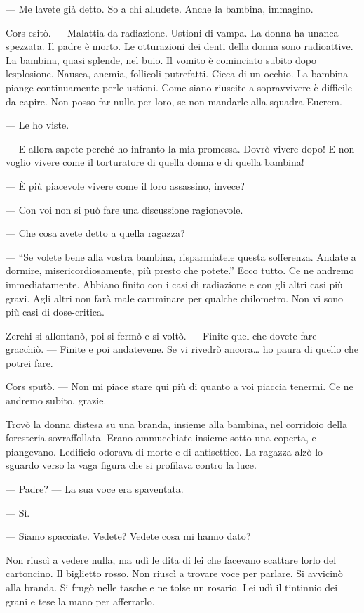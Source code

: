 --- Me l\textquotesingle avete già detto. So a chi alludete. Anche la
bambina, immagino.

Cors esitò. --- Malattia da radiazione. Ustioni di vampa. La donna ha
un\textquotesingle anca spezzata. Il padre è morto. Le otturazioni dei
denti della donna sono radioattive. La bambina, quasi splende, nel buio.
Il vomito è cominciato subito dopo l\textquotesingle esplosione. Nausea,
anemia, follicoli putrefatti. Cieca di un occhio. La bambina piange
continuamente perle ustioni. Come siano riuscite a sopravvivere è
difficile da capire. Non posso far nulla per loro, se non mandarle alla
squadra Eucrem.

--- Le ho viste.

--- E allora sapete perché ho infranto la mia promessa. Dovrò vivere
dopo! E non voglio vivere come il torturatore di quella donna e di
quella bambina!

--- È più piacevole vivere come il loro assassino, invece?

--- Con voi non si può fare una discussione ragionevole.

--- Che cosa avete detto a quella ragazza?

--- ``Se volete bene alla vostra bambina, risparmiatele questa
sofferenza. Andate a dormire, misericordiosamente, più presto che
potete.'' Ecco tutto. Ce ne andremo immediatamente. Abbiano finito con i
casi di radiazione e con gli altri casi più gravi. Agli altri non farà
male camminare per qualche chilometro. Non vi sono più casi di
dose-critica.

Zerchi si allontanò, poi si fermò e si voltò. --- Finite quel che dovete
fare --- gracchiò. --- Finite e poi andatevene. Se vi rivedrò
ancora\ldots{} ho paura di quello che potrei fare.

Cors sputò. --- Non mi piace stare qui più di quanto a voi piaccia
tenermi. Ce ne andremo subito, grazie.

Trovò la donna distesa su una branda, insieme alla bambina, nel
corridoio della foresteria sovraffollata. Erano ammucchiate insieme
sotto una coperta, e piangevano. L\textquotesingle edificio odorava di
morte e di antisettico. La ragazza alzò lo sguardo verso la vaga figura
che si profilava contro la luce.

--- Padre? --- La sua voce era spaventata.

--- Sì.

--- Siamo spacciate. Vedete? Vedete cosa mi hanno dato?

Non riuscì a vedere nulla, ma udì le dita di lei che facevano scattare
l\textquotesingle orlo del cartoncino. Il biglietto rosso. Non riuscì a
trovare voce per parlare. Si avvicinò alla branda. Si frugò nelle tasche
e ne tolse un rosario. Lei udì il tintinnio dei grani e tese la mano per
afferrarlo.

